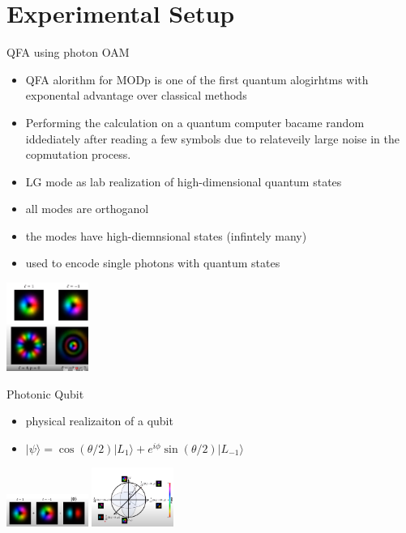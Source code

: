 \documentclass[aspectratio=169,9pt]{beamer}
\begin{document}
\section{Experimental Setup}

\begin{frame}[t]{QFA using photon OAM}
  \begin{itemize}
    \item QFA alorithm for MODp is one of the first quantum alogirhtms with exponental advantage over classical methods
    \item Performing the calculation on a quantum computer bacame random iddediately after reading a few symbols due to relateveily large noise in the copmutation process.
    \vspace*{1em}
    \item LG mode as lab realization of high-dimensional quantum states
    \item all modes are orthoganol
    \item the modes have high-diemnsional states (infintely many)
    \item used to encode single photons with quantum states
  \end{itemize}
  \includegraphics[width=0.2\textwidth]{LG_modes_structured_photons.png}
\end{frame}


\begin{frame}[t]{Photonic Qubit}
  \begin{itemize}
    \item physical realizaiton of a qubit
    \item $|\psi\rangle=\cos(\theta/2)|L_1\rangle + e^{i\phi}\sin(\theta/2)|L_{-1}\rangle$
  \end{itemize}
  \includegraphics[width=0.2\textwidth]{photonic_superposition_qubit.png}
  \includegraphics[width=0.2\textwidth]{photonic_bloch_sphere.png}
\end{frame}
\end{document}
